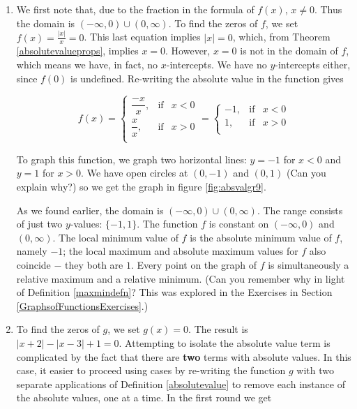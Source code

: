 {
\begin{enumerate}

\item  We first note that, due to the fraction in the formula of $f(x)$, $x \neq 0$.  Thus the domain is $(-\infty, 0) \cup (0, \infty)$.  To find the zeros of $f$, we set $f(x) = \frac{|x|}{x} = 0$.  This last equation implies $|x|=0$, which, from Theorem \ref{absolutevalueprops}, implies $x=0$.  However, $x=0$ is not in the domain of $f$, which means we have, in fact, no $x$-intercepts.  We have no $y$-intercepts either, since $f(0)$ is undefined.  Re-writing the absolute value in the function gives

\[ f(x) =\left\{ \begin{array}{rcl} \dfrac{-x}{x}, & \mbox{if} & x <0  \\ [10pt] \dfrac{x}{x}, & \mbox{if} & x > 0 \\ \end{array} \right. = \left\{ \begin{array}{rcl} -1, & \mbox{if} & x < 0 \\ 1, & \mbox{if} & x >0 \\ \end{array} \right. \]

To graph this function, we graph two horizontal lines:  $y = -1$ for $x < 0$ and $y = 1$ for $x > 0$.  We have open circles at $(0,-1)$ and $(0,1)$ (Can you explain why?) so we get the graph in figure \ref{fig:absvalgr9}.

\drawexampleline


As we found earlier, the domain is $(-\infty, 0)\cup(0,\infty)$.  The range consists of just two $y$-values: $\{-1,1\}$.  The function $f$ is constant on $(-\infty,0)$ and $(0,\infty)$.  The local minimum value of $f$ is the absolute minimum value of $f$, namely $-1$;  the local maximum and absolute maximum values for $f$ also coincide $-$ they both are $1$.  Every point on the graph of $f$ is simultaneously a relative maximum and a relative minimum. (Can you remember why in light of Definition \ref{maxmindefn}?  This was explored in the Exercises in Section \ref{GraphsofFunctionsExercises}.)

\item  To find the zeros of $g$, we set $g(x) = 0$.  The result is $|x+2|-|x-3| +1 = 0$.  Attempting to isolate the absolute value term is complicated by the fact that there are \textbf{two} terms with absolute values.  In this case, it easier to proceed using cases by re-writing the function $g$ with two separate applications of Definition \ref{absolutevalue} to remove each instance of the absolute values, one at a time.  In the first round we get 


\end{enumerate}}
